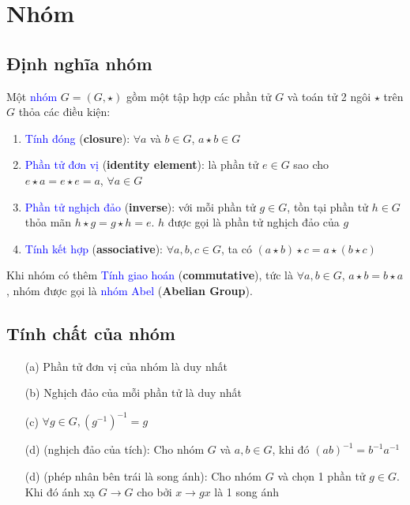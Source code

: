 \chapter{Nhóm}

\section{Định nghĩa nhóm}

Một \textcolor{blue}{nhóm} $G=(G, \star)$ gồm một tập hợp các phần tử $G$ và toán tử 2 ngôi $\star$ trên $G$ thỏa các điều kiện:

\begin{enumerate}
	\item \textcolor{blue}{Tính đóng} (\textbf{closure}): $\forall a$ và $b \in G$, $a \star b \in G$
	\item \textcolor{blue}{Phần tử đơn vị} (\textbf{identity element}): là phần tử $e \in G$ sao cho $e \star a = e \star e = a$,  $\forall a \in G$
	\item \textcolor{blue}{Phần tử nghịch đảo} (\textbf{inverse}): với mỗi phần tử $g \in G$, tồn tại phần tử $h \in G$ thỏa mãn $h \star g = g \star h = e$. $h$ được gọi là phần tử nghịch đảo của $g$
	\item \textcolor{blue}{Tính kết hợp} (\textbf{associative}): $\forall a, b, c \in G$, ta có $(a \star b) \star c = a \star (b \star c)$
\end{enumerate} 

Khi nhóm có thêm \textcolor{blue}{Tính giao hoán} (\textbf{commutative}), tức là $\forall a, b \in G$, $a \star b = b \star a$, nhóm được gọi là \textcolor{blue}{nhóm Abel} (\textbf{Abelian Group}).

\section{Tính chất của nhóm}

\begin{enumerate}
	\item [(a)] Phần tử đơn vị của nhóm là duy nhất
	\item [(b)] Nghịch đảo của mỗi phần tử là duy nhất
	\item [(c)] $\forall g \in G, (g^{-1})^{-1} = g$
	\item [(d)] (nghịch đảo của tích): Cho nhóm $G$ và $a,b \in G$, khi đó $(ab)^{-1}=b^{-1} a^{-1}$
	\item [(d)] (phép nhân bên trái là song ánh): Cho nhóm $G$ và chọn 1 phần tử $g \in G$. Khi đó ánh xạ $G \rightarrow G$ cho bởi $x \rightarrow gx$ là 1 song ánh
\end{enumerate}

